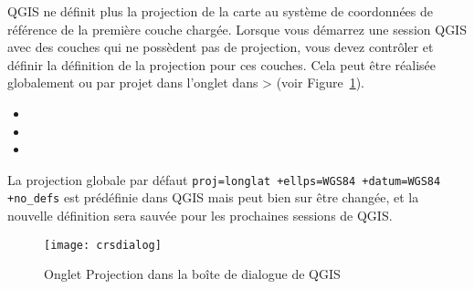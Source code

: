 QGIS ne définit plus la projection de la carte au système de
coordonnées de référence de la première couche chargée. Lorsque vous démarrez
une session QGIS avec des couches qui ne possèdent pas de projection, vous devez
contrôler et définir la définition de la projection pour ces couches. Cela peut
être réalisée globalement ou par projet dans l'onglet  dans 
 >  (voir
 Figure~\ref{fig:crsdialog}).

\begin{itemize}
\item {}
\item {}
\item {}
\end{itemize}

La projection globale par défaut \texttt{proj=longlat +ellps=WGS84 +datum=WGS84
 +no\_defs} est prédéfinie dans QGIS mais peut bien sur être changée, et la
nouvelle définition sera sauvée pour les prochaines sessions de QGIS.

\begin{figure}[ht]
   \begin{center}
   \caption{Onglet Projection dans la boîte de dialogue de QGIS
\nixcaption}\label{fig:crsdialog}\smallskip
   \texttt{[image: crsdialog]}
\end{center}
\end{figure}

